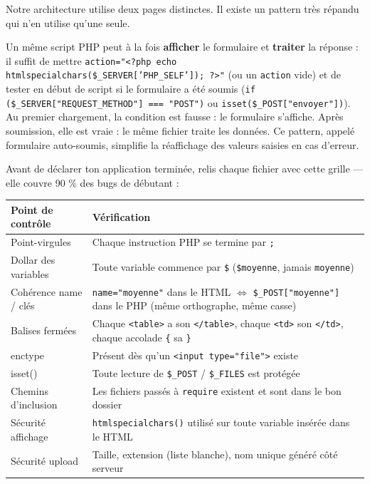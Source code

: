 \documentclass[11pt]{article}
\newcommand{\cle}[1]{{\popxbold\color{popdark}#1}}
\newcounter{popsec}
\newcounter{popsub}
\newcommand{\courssub}[1]{%
  \stepcounter{popsub}%
  \par\vspace{9pt}\noindent{\popxbold\fontsize{11.5}{13}\selectfont\color{popink}{\color{poporange}\thepopsec.\thepopsub}\hspace{6pt}#1}\par\nopagebreak\vspace{4pt}
}
\begin{document}
Notre architecture utilise deux pages distinctes. Il existe un pattern très répandu qui n'en utilise qu'une seule.

\begin{propriete}
Un même script PHP peut à la fois \textbf{afficher} le formulaire et \textbf{traiter} la réponse : il suffit de mettre \texttt{action="<?php echo htmlspecialchars(\$\_SERVER['PHP\_SELF']); ?>"} (ou un \texttt{action} vide) et de tester en début de script si le formulaire a été soumis (\texttt{if (\$\_SERVER["REQUEST\_METHOD"] === "POST")} ou \texttt{isset(\$\_POST["envoyer"])}). Au premier chargement, la condition est fausse : le formulaire s'affiche. Après soumission, elle est vraie : le même fichier traite les données. Ce pattern, appelé \cle{formulaire auto-soumis}, simplifie la réaffichage des valeurs saisies en cas d'erreur.
\end{propriete}

\courssub{Grille de relecture du code}

Avant de déclarer ton application terminée, relis chaque fichier avec cette grille — elle couvre 90 \% des bugs de débutant :

\begin{center}
\begin{tabularx}{\linewidth}{|l|X|}
\hline
\rowcolor{popblueL}
\textbf{Point de contrôle} & \textbf{Vérification} \\
\hline
Point-virgules & Chaque instruction PHP se termine par \texttt{;} \\
\hline
Dollar des variables & Toute variable commence par \texttt{\$} (\texttt{\$moyenne}, jamais \texttt{moyenne}) \\
\hline
Cohérence name / clés & \texttt{name="moyenne"} dans le HTML $\Leftrightarrow$ \texttt{\$\_POST["moyenne"]} dans le PHP (même orthographe, même casse) \\
\hline
Balises fermées & Chaque \texttt{<table>} a son \texttt{</table>}, chaque \texttt{<td>} son \texttt{</td>}, chaque accolade \texttt{\{} sa \texttt{\}} \\
\hline
enctype & Présent dès qu'un \texttt{<input type="file">} existe \\
\hline
isset() & Toute lecture de \texttt{\$\_POST} / \texttt{\$\_FILES} est protégée \\
\hline
Chemins d'inclusion & Les fichiers passés à \texttt{require} existent et sont dans le bon dossier \\
\hline
Sécurité affichage & \texttt{htmlspecialchars()} utilisé sur toute variable insérée dans le HTML \\
\hline
Sécurité upload & Taille, extension (liste blanche), nom unique généré côté serveur \\
\hline
\end{tabularx}
\end{center}
\end{document}
